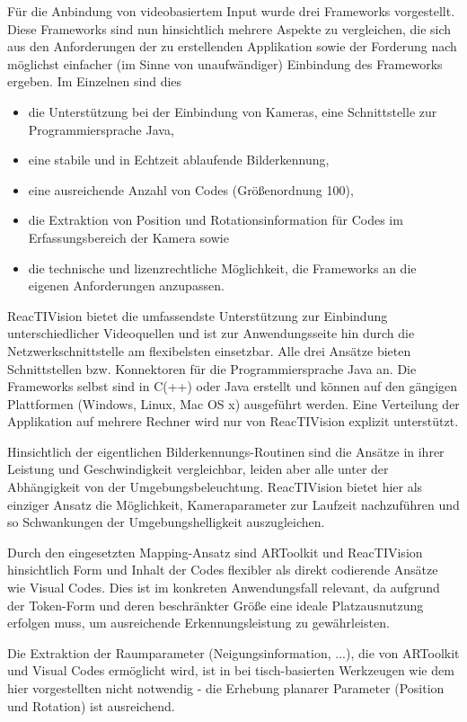 Für die Anbindung von videobasiertem Input wurde drei Frameworks vorgestellt. Diese Frameworks sind nun hinsichtlich mehrere Aspekte zu vergleichen, die sich aus den Anforderungen der zu erstellenden Applikation sowie der Forderung nach möglichst einfacher (im Sinne von unaufwändiger) Einbindung des Frameworks ergeben. Im Einzelnen sind dies 
\begin{itemize}
	\item die Unterstützung bei der Einbindung von Kameras, eine Schnittstelle zur Programmiersprache Java,
	\item eine stabile und in Echtzeit ablaufende Bilderkennung,
	\item eine ausreichende Anzahl von Codes (Größenordnung 100),
	\item die Extraktion von Position und Rotationsinformation für Codes im Erfassungsbereich der Kamera sowie
	\item die technische und lizenzrechtliche Möglichkeit, die Frameworks an die eigenen Anforderungen anzupassen.
\end{itemize}
    
ReacTIVision bietet die umfassendste Unterstützung zur Einbindung unterschiedlicher Videoquellen und ist zur Anwendungsseite hin durch die Netzwerkschnittstelle am flexibelsten einsetzbar. Alle drei Ansätze bieten Schnittstellen bzw. Konnektoren für die Programmiersprache Java an. Die Frameworks selbst sind in C(++) oder Java erstellt und können auf den gängigen Plattformen (Windows, Linux, Mac OS x) ausgeführt werden. Eine Verteilung der Applikation auf mehrere Rechner wird nur von ReacTIVision explizit unterstützt.

Hinsichtlich der eigentlichen Bilderkennungs-Routinen sind die Ansätze in ihrer Leistung und Geschwindigkeit vergleichbar, leiden aber alle unter der Abhängigkeit von der Umgebungsbeleuchtung. ReacTIVision bietet hier als einziger Ansatz die Möglichkeit, Kameraparameter zur Laufzeit nachzuführen und so Schwankungen der Umgebungshelligkeit auszugleichen.

Durch den eingesetzten Mapping-Ansatz sind ARToolkit und ReacTIVision hinsichtlich Form und Inhalt der Codes flexibler als direkt codierende Ansätze wie Visual Codes. Dies ist im konkreten Anwendungsfall relevant, da aufgrund der Token-Form und deren beschränkter Größe eine ideale Platzausnutzung erfolgen muss, um ausreichende Erkennungsleistung zu gewährleisten.

Die Extraktion der Raumparameter (Neigungsinformation, ...), die von ARToolkit und Visual Codes ermöglicht wird, ist in bei tisch-basierten Werkzeugen wie dem hier vorgestellten nicht notwendig - die Erhebung planarer Parameter (Position und Rotation) ist ausreichend.

